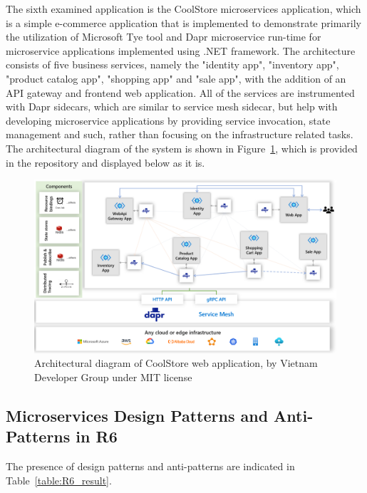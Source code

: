\documentclass{Configuration_Files/PoliMi3i_thesis}
\begin{document}
The sixth examined application is the CoolStore microservices application, which is a simple e-commerce application that is implemented to demonstrate primarily the utilization of Microsoft Tye\footnotemark[95] tool and Dapr\footnotemark[96] microservice run-time for microservice applications implemented using .NET framework.
The architecture consists of five business services, namely the "identity app", "inventory app", "product catalog app", "shopping app" and "sale app", with the addition of an API gateway and frontend web application.
All of the services are instrumented with Dapr sidecars, which are similar to service mesh sidecar, but help with developing microservice applications by providing service invocation, state management and such, rather than focusing on the infrastructure related tasks.
The architectural diagram of the system is shown in Figure~\ref{fig:R6_arch}, which is provided in the repository and displayed below as it is.

\begin{figure}[H]
\centering
\includegraphics[width=1\textwidth]{myImages/R6.png}
\caption{Architectural diagram of CoolStore web application, by Vietnam Developer Group under MIT license}
\label{fig:R6_arch}
\end{figure}

\subsection{Microservices Design Patterns and Anti-Patterns in R6}
\label{subsec:R6_detection}

The presence of design patterns and anti-patterns are indicated in Table~\ref{table:R6_result}.
\end{document}

